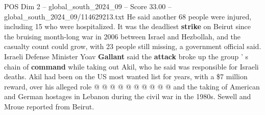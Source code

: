 \begin{textsample}{POS Dim 2 – global\_south\_2024\_09 – Score 33.00 – global\_south\_2024\_09/114629213.txt}
He said another 68 people were injured, including 15 who were hospitalized.
It was the deadliest \textbf{strike} on Beirut since the bruising month-long war in 2006 between Israel and Hezbollah, and the casualty count could grow, with 23 people still missing, a government official said.
Israeli Defense Minister Yoav \textbf{Gallant} said the \textbf{attack} broke up the group ' s chain of \textbf{command} while taking out Akil, who he said was responsible for Israeli deaths.
Akil had been on the US most wanted list for years, with a \$7 million reward, over his alleged role @ @ @ @ @ @ @ @ @ @ and the taking of American and German hostages in Lebanon during the civil war in the 1980s.
Sewell and Mroue reported from Beirut.

\end{textsample}
